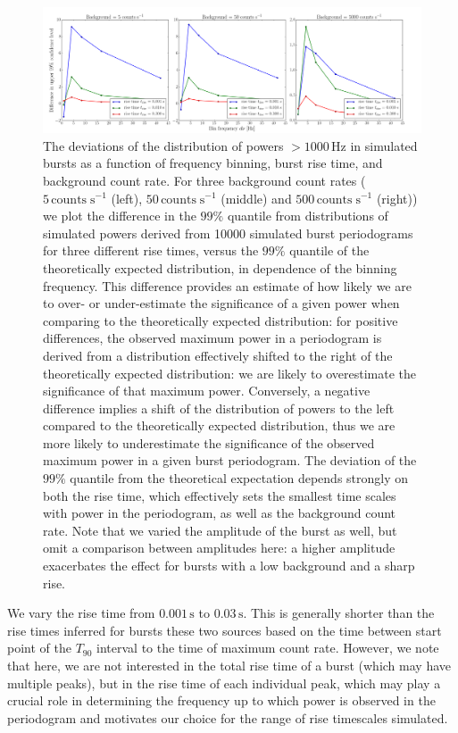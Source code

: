 \documentclass[numberedappendix]{emulateapj}
\newcommand{\hz}{\,\mathrm{Hz}}
\begin{document}
\begin{figure}[htbp]
\begin{center}
\includegraphics[width=18cm]{weak_burst_sims.png}
\caption{The deviations of the distribution of powers $>1000 \hz$ in simulated bursts as a function of frequency binning, burst rise time, and background count rate. For three background count rates ($5 \, \mathrm{counts} \; \mathrm{s}^{-1}$ (left), $50 \, \mathrm{counts} \; \mathrm{s}^{-1}$ (middle) and $500 \, \mathrm{counts} \; \mathrm{s}^{-1}$ (right)) we plot the difference in the $99\%$ quantile from distributions of simulated powers derived from 10000 simulated burst periodograms for three different rise times, versus the $99\%$ quantile of the theoretically expected distribution, in dependence of the binning frequency. This difference provides an estimate of how likely we are to over- or under-estimate the significance of a given power when comparing to the theoretically expected distribution: for positive differences, the observed maximum power in a periodogram is derived from a distribution effectively shifted to the right of the theoretically expected distribution: we are likely to overestimate the significance of that maximum power. Conversely, a negative difference implies a shift of the distribution of powers to the left compared to the theoretically expected distribution, thus we are more likely to underestimate the significance of the observed maximum power in a given burst periodogram. The deviation of the $99\%$ quantile from the theoretical expectation depends strongly on both the rise time, which effectively sets the smallest time scales with power in the periodogram, as well as the background count rate. Note that we varied the amplitude of the burst as well, but omit a comparison between amplitudes here: a higher amplitude exacerbates the effect for bursts with a low background and a sharp rise.}
\label{fig:weak_bursts}
\end{center}
\end{figure}



We vary the rise time from $0.001 \, \mathrm{s}$ to $0.03 \, \mathrm{s}$. This is generally shorter than the rise times inferred for bursts these two sources based on the time between start point of the $T_{90}$ interval to the time of maximum count rate. However, we note that here, we are not interested in the total rise time of a burst (which may have multiple peaks), but in the rise time of each individual peak, which may play a crucial role in determining the frequency up to which power is observed in the periodogram and motivates our choice for the range of rise timescales simulated. 
\end{document}
